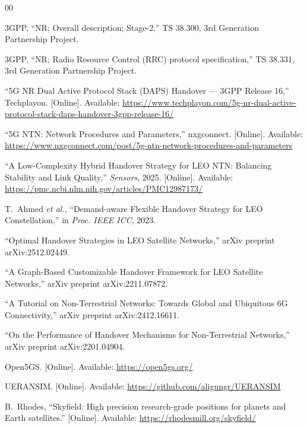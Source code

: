 \documentclass[conference]{IEEEtran}
\begin{document}
\begin{thebibliography}{00}

 3GPP, ``NR; Overall description; Stage-2,''
TS 38.300, 3rd Generation Partnership Project.

 3GPP, ``NR; Radio Resource Control (RRC) protocol
specification,'' TS 38.331, 3rd Generation Partnership Project.

 ``5G NR Dual Active Protocol Stack (DAPS) Handover ---
3GPP Release 16,'' Techplayon. [Online]. Available:
\url{https://www.techplayon.com/5g-nr-dual-active-protocol-stack-daps-handover-3gpp-release-16/}

 ``5G NTN: Network Procedures and Parameters,''
nxgconnect. [Online]. Available:
\url{https://www.nxgconnect.com/post/5g-ntn-network-procedures-and-parameters}

 ``A Low-Complexity Hybrid Handover Strategy for LEO NTN:
Balancing Stability and Link Quality,'' \emph{Sensors}, 2025. [Online].
Available: \url{https://pmc.ncbi.nlm.nih.gov/articles/PMC12987173/}

 T.~Ahmed \emph{et al.}, ``Demand-aware Flexible Handover
Strategy for LEO Constellation,'' in \emph{Proc. IEEE ICC}, 2023.

 ``Optimal Handover Strategies in LEO Satellite
Networks,'' arXiv preprint arXiv:2512.02449.

 ``A Graph-Based Customizable Handover Framework for LEO
Satellite Networks,'' arXiv preprint arXiv:2211.07872.

 ``A Tutorial on Non-Terrestrial Networks: Towards Global
and Ubiquitous 6G Connectivity,'' arXiv preprint arXiv:2412.16611.

 ``On the Performance of Handover Mechanisms for
Non-Terrestrial Networks,'' arXiv preprint arXiv:2201.04904.

 Open5GS. [Online]. Available: \url{https://open5gs.org/}

 UERANSIM. [Online]. Available:
\url{https://github.com/aligungr/UERANSIM}

 B.~Rhodes, ``Skyfield: High precision research-grade
positions for planets and Earth satellites.'' [Online]. Available:
\url{https://rhodesmill.org/skyfield/}

\end{thebibliography}

\balance
\end{document}
